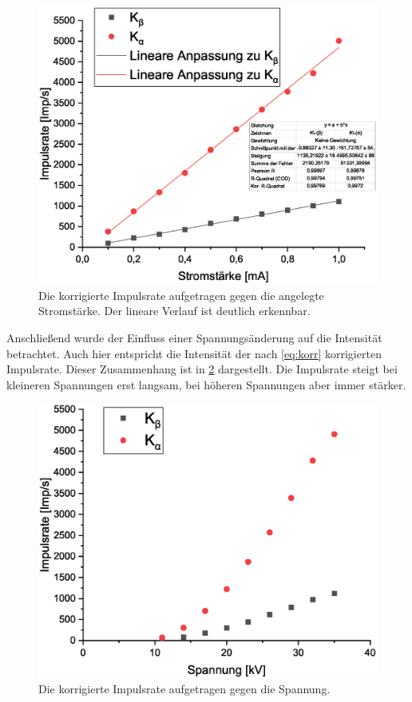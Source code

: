 \documentclass[
	a4paper,
	12pt,
	pagesize,
	ngerman
]{scrartcl}
\begin{document}
\begin{figure}[h!]
	\centering
	\includegraphics[scale = 0.6]{strom.eps}
	\caption{Die korrigierte Impulsrate aufgetragen gegen die angelegte Stromstärke. Der lineare Verlauf ist deutlich erkennbar.}
	\label{strom}
\end{figure}

Anschließend wurde der Einfluss einer Spannungsänderung auf die Intensität betrachtet. Auch hier entspricht die Intensität der nach \cref{eq:korr} korrigierten Impulsrate. Dieser Zusammenhang ist in \cref{spannung} dargestellt. Die Impulsrate steigt bei kleineren Spannungen erst langsam, bei höheren Spannungen aber immer stärker.

\begin{figure}[h!]
	\centering
	\includegraphics[scale = 0.6]{spannung.eps}
	\caption{Die korrigierte Impulsrate aufgetragen gegen die Spannung.}
	\label{spannung}
\end{figure}
\end{document}
